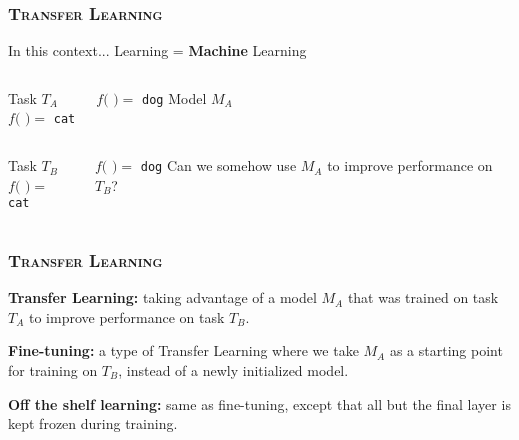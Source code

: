 \documentclass{beamer}
\newcommand{\createtitle}[1]{\frametitle{\textsc{\bfseries#1}}}
\begin{document}
\begin{frame}

\pause
\createtitle{Transfer Learning}
\begin{block}{In this context...}
Learning = \textbf{Machine} Learning
\end{block}

\pause
\begin{columns}[t]
\centering
Task $T_A$\\
\vspace{0.15cm}
$f($
$) =$ \texttt{cat}

$f($
$) =$ \texttt{dog}
\pause
\centering
Model $M_A$\\
\def\svgwidth{0.5\textwidth}

\end{columns}

\begin{columns}
\pause
\centering
Task $T_B$\\
\vspace{0.15cm}
$f($
$) =$ \texttt{cat}

$f($
$) =$ \texttt{dog}
\pause
\centering
Can we somehow use $M_A$ to improve performance on $T_B$?
\end{columns}

\end{frame}

\begin{frame}
\createtitle{Transfer Learning}

\begin{definition}
\textbf{Transfer Learning:} {\footnotesize taking advantage of a model $M_A$ that was trained on task $T_A$ to improve performance on task $T_B$.}
\end{definition}

\pause
\begin{definition}
\textbf{Fine-tuning:} {\footnotesize a type of Transfer Learning where we take $M_A$ as a starting point for training on $T_B$, instead of a newly initialized model.}
\end{definition}

\pause
\begin{definition}
\textbf{Off the shelf learning:} {\footnotesize same as fine-tuning, except that all but the final layer is kept frozen during training.}
\end{definition}

\end{frame}
\end{document}
